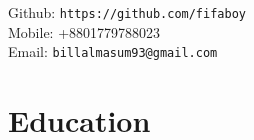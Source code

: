 \documentclass[11pt,a4paper,sans]{moderncv}        %
\begin{document}
\makecvtitle
\begin{flushright}
	{\normalfont\normalsize Github: \texttt{https://github.com/fifaboy}}\\
	{\normalfont \normalsize Mobile: +8801779788023}\\
	{\normalfont\normalsize	Email: \texttt{billalmasum93@gmail.com}  } 
\end{flushright}

\section{Education}

\end{document}
